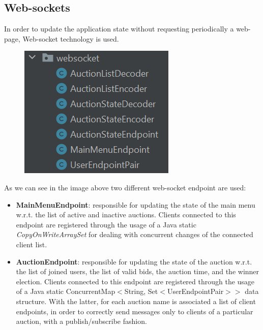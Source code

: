 \subsection{Web-sockets}
In order to update the application state without requesting periodically a web-page, Web-socket technology is used.

\begin{figure}[H]
	\centering
	\includegraphics[width=0.4\linewidth]{img/websockets}
	\caption{}
	\label{fig:websockets}
\end{figure}

As we can see in the image above two different web-socket endpoint are used:
\begin{itemize}
	\item \textbf{MainMenuEndpoint}: responsible for updating the state of the main menu w.r.t. the list of active and inactive auctions. Clients connected to this endpoint are registered through the usage of a Java static \textit{CopyOnWriteArraySet} for dealing with concurrent changes of the connected client list.
	\item \textbf{AuctionEndpoint}: responsible for updating the state of the auction w.r.t. the list of joined users, the list of valid bids, the auction time, and the winner election. Clients connected to this endpoint are registered through the usage of a Java static ConcurrentMap$<$String, Set$<$UserEndpointPair$>>$ data structure. With the latter, for each auction name is associated a list of client endpoints, in order to correctly send messages only to clients of a particular auction, with a publish/subscribe fashion.
\end{itemize}
